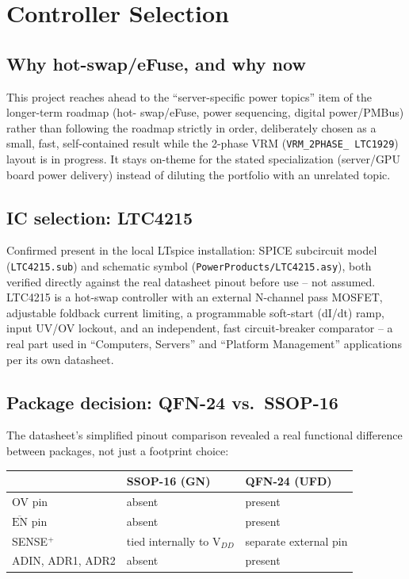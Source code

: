 \documentclass[11pt,letterpaper]{article}
\begin{document}
\section{Controller Selection}

\subsection{Why hot-swap/eFuse, and why now}

This project reaches ahead to the ``server-specific power topics'' item of the longer-term roadmap (hot-
swap/eFuse, power sequencing, digital power/PMBus) rather than following the roadmap strictly in order,
deliberately chosen as a small, fast, self-contained result while the 2-phase VRM (\texttt{VRM\_2PHASE\_
LTC1929}) layout is in progress. It stays on-theme for the stated specialization (server/GPU board power
delivery) instead of diluting the portfolio with an unrelated topic.

\subsection{IC selection: LTC4215}

Confirmed present in the local LTspice installation: SPICE subcircuit model (\texttt{LTC4215.sub}) and
schematic symbol (\texttt{PowerProducts/LTC4215.asy}), both verified directly against the real datasheet
pinout before use -- not assumed. LTC4215 is a hot-swap controller with an external N-channel pass
MOSFET, adjustable foldback current limiting, a programmable soft-start (dI/dt) ramp, input UV/OV lockout,
and an independent, fast circuit-breaker comparator -- a real part used in ``Computers, Servers'' and
``Platform Management'' applications per its own datasheet.

\subsection{Package decision: QFN-24 vs.\ SSOP-16}

The datasheet's simplified pinout comparison revealed a real functional difference between packages, not
just a footprint choice:

\begin{center}
\begin{tabular}{@{}lll@{}}
\toprule
& \textbf{SSOP-16 (GN)} & \textbf{QFN-24 (UFD)} \\
\midrule
OV pin & absent & present \\
$\overline{\text{EN}}$ pin & absent & present \\
SENSE$^+$ & tied internally to V$_{DD}$ & separate external pin \\
ADIN, ADR1, ADR2 & absent & present \\
\bottomrule
\end{tabular}
\end{center}
\end{document}
